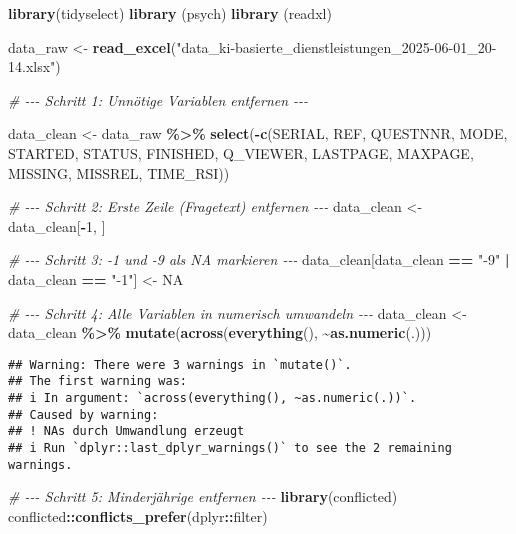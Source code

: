 \documentclass[
]{article}
\newenvironment{Shaded}{\begin{snugshade}}{\end{snugshade}}
\newcommand{\CommentTok}[1]{\textcolor[rgb]{0.56,0.35,0.01}{\textit{#1}}}
\newcommand{\ConstantTok}[1]{\textcolor[rgb]{0.56,0.35,0.01}{#1}}
\newcommand{\DecValTok}[1]{\textcolor[rgb]{0.00,0.00,0.81}{#1}}
\newcommand{\FunctionTok}[1]{\textcolor[rgb]{0.13,0.29,0.53}{\textbf{#1}}}
\newcommand{\NormalTok}[1]{#1}
\newcommand{\OtherTok}[1]{\textcolor[rgb]{0.56,0.35,0.01}{#1}}
\newcommand{\SpecialCharTok}[1]{\textcolor[rgb]{0.81,0.36,0.00}{\textbf{#1}}}
\newcommand{\StringTok}[1]{\textcolor[rgb]{0.31,0.60,0.02}{#1}}
\begin{document}
\begin{Shaded}
\begin{Highlighting}[]
\FunctionTok{library}\NormalTok{(tidyselect)}
\FunctionTok{library}\NormalTok{ (psych)}
\FunctionTok{library}\NormalTok{ (readxl)}

\NormalTok{data\_raw }\OtherTok{\textless{}{-}} \FunctionTok{read\_excel}\NormalTok{(}\StringTok{"data\_ki{-}basierte\_dienstleistungen\_2025{-}06{-}01\_20{-}14.xlsx"}\NormalTok{)}

\CommentTok{\# {-}{-}{-} Schritt 1: Unnötige Variablen entfernen {-}{-}{-}}

\NormalTok{data\_clean }\OtherTok{\textless{}{-}}\NormalTok{ data\_raw }\SpecialCharTok{\%\textgreater{}\%}
  \FunctionTok{select}\NormalTok{(}\SpecialCharTok{{-}}\FunctionTok{c}\NormalTok{(SERIAL, REF, QUESTNNR, MODE, STARTED, STATUS, FINISHED, Q\_VIEWER, LASTPAGE, MAXPAGE, MISSING, MISSREL, TIME\_RSI))}

\CommentTok{\# {-}{-}{-} Schritt 2: Erste Zeile (Fragetext) entfernen {-}{-}{-}}
\NormalTok{data\_clean }\OtherTok{\textless{}{-}}\NormalTok{ data\_clean[}\SpecialCharTok{{-}}\DecValTok{1}\NormalTok{, ]}

\CommentTok{\# {-}{-}{-} Schritt 3: {-}1 und {-}9 als NA markieren {-}{-}{-}}
\NormalTok{data\_clean[data\_clean }\SpecialCharTok{==} \StringTok{"{-}9"} \SpecialCharTok{|}\NormalTok{ data\_clean }\SpecialCharTok{==} \StringTok{"{-}1"}\NormalTok{] }\OtherTok{\textless{}{-}} \ConstantTok{NA}

\CommentTok{\# {-}{-}{-} Schritt 4: Alle Variablen in numerisch umwandeln {-}{-}{-}}
\NormalTok{data\_clean }\OtherTok{\textless{}{-}}\NormalTok{ data\_clean }\SpecialCharTok{\%\textgreater{}\%}
  \FunctionTok{mutate}\NormalTok{(}\FunctionTok{across}\NormalTok{(}\FunctionTok{everything}\NormalTok{(), }\SpecialCharTok{\textasciitilde{}}\FunctionTok{as.numeric}\NormalTok{(.)))}
\end{Highlighting}
\end{Shaded}

\begin{verbatim}
## Warning: There were 3 warnings in `mutate()`.
## The first warning was:
## i In argument: `across(everything(), ~as.numeric(.))`.
## Caused by warning:
## ! NAs durch Umwandlung erzeugt
## i Run `dplyr::last_dplyr_warnings()` to see the 2 remaining warnings.
\end{verbatim}

\begin{Shaded}
\begin{Highlighting}[]
\CommentTok{\# {-}{-}{-} Schritt 5: Minderjährige entfernen {-}{-}{-}}
\FunctionTok{library}\NormalTok{(conflicted)}
\NormalTok{conflicted}\SpecialCharTok{::}\FunctionTok{conflicts\_prefer}\NormalTok{(dplyr}\SpecialCharTok{::}\NormalTok{filter)}
\end{Highlighting}
\end{Shaded}
\end{document}
